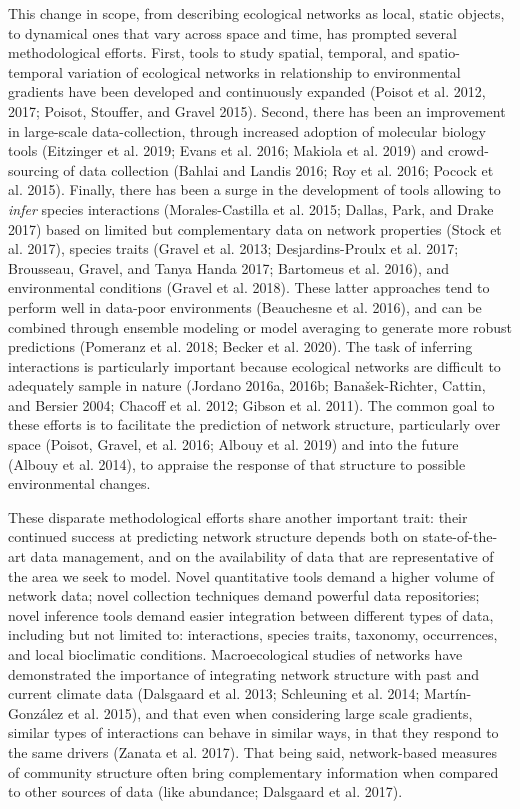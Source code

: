 \documentclass[10pt,oneside]{article}
\begin{document}
This change in scope, from describing ecological networks as local,
static objects, to dynamical ones that vary across space and time, has
prompted several methodological efforts. First, tools to study spatial,
temporal, and spatio-temporal variation of ecological networks in
relationship to environmental gradients have been developed and
continuously expanded (Poisot et al. 2012, 2017; Poisot, Stouffer, and
Gravel 2015). Second, there has been an improvement in large-scale
data-collection, through increased adoption of molecular biology tools
(Eitzinger et al. 2019; Evans et al. 2016; Makiola et al. 2019) and
crowd-sourcing of data collection (Bahlai and Landis 2016; Roy et al.
2016; Pocock et al. 2015). Finally, there has been a surge in the
development of tools allowing to \emph{infer} species interactions
(Morales-Castilla et al. 2015; Dallas, Park, and Drake 2017) based on
limited but complementary data on network properties (Stock et al.
2017), species traits (Gravel et al. 2013; Desjardins-Proulx et al.
2017; Brousseau, Gravel, and Tanya Handa 2017; Bartomeus et al. 2016),
and environmental conditions (Gravel et al. 2018). These latter
approaches tend to perform well in data-poor environments (Beauchesne et
al. 2016), and can be combined through ensemble modeling or model
averaging to generate more robust predictions (Pomeranz et al. 2018;
Becker et al. 2020). The task of inferring interactions is particularly
important because ecological networks are difficult to adequately sample
in nature (Jordano 2016a, 2016b; Banašek-Richter, Cattin, and Bersier
2004; Chacoff et al. 2012; Gibson et al. 2011). The common goal to these
efforts is to facilitate the prediction of network structure,
particularly over space (Poisot, Gravel, et al. 2016; Albouy et al.
2019) and into the future (Albouy et al. 2014), to appraise the response
of that structure to possible environmental changes.

These disparate methodological efforts share another important trait:
their continued success at predicting network structure depends both on
state-of-the-art data management, and on the availability of data that
are representative of the area we seek to model. Novel quantitative
tools demand a higher volume of network data; novel collection
techniques demand powerful data repositories; novel inference tools
demand easier integration between different types of data, including but
not limited to: interactions, species traits, taxonomy, occurrences, and
local bioclimatic conditions. Macroecological studies of networks have
demonstrated the importance of integrating network structure with past
and current climate data (Dalsgaard et al. 2013; Schleuning et al. 2014;
Martín-González et al. 2015), and that even when considering large scale
gradients, similar types of interactions can behave in similar ways, in
that they respond to the same drivers (Zanata et al. 2017). That being
said, network-based measures of community structure often bring
complementary information when compared to other sources of data (like
abundance; Dalsgaard et al. 2017).
\end{document}
